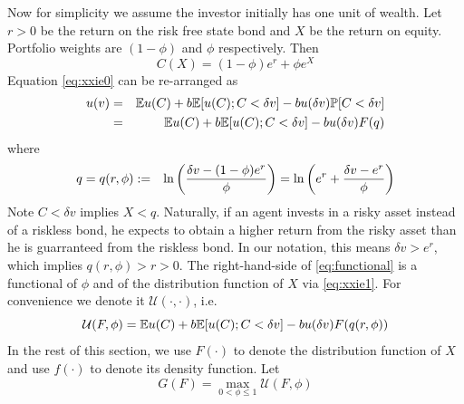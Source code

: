 \documentclass{article}
\begin{document}
Now for simplicity we assume the investor initially has one unit of
wealth. Let $r > 0$ be the return on the risk free state bond and $X$
be the return on equity. Portfolio weights are $\left(1-\phi\right)$
and $\phi$ respectively. Then
\begin{equation}
  \label{eq:xxie1}
  C(X) = (1 - \phi) e^r + \phi e^X
\end{equation}
Equation \eqref{eq:xxie0} can be re-arranged as
\begin{eqnarray}
u(v) &=& \mathbb{E} u(C) + b \mathbb{E} [u(C); C < \delta v] - b u(\delta v) \mathbb{P}[C < \delta v] \nonumber \\
&=& \mathbb{E} u(C) + b \mathbb{E} [u(C); C < \delta v] - b u(\delta v) F(q) \label{eq:functional}
\end{eqnarray}
where
\begin{eqnarray*}
  q = q(r, \phi) &:=& \ln \left( {
      \delta v - (1 - \phi) e^r
      \over
      \phi
    } \right) = \ln\left(
    e^r + {\delta v - e^r \over \phi}
  \right)
\end{eqnarray*}
Note $C < \delta v$ implies $X < q$. Naturally, if an agent invests in
a risky asset instead of a riskless bond, he expects to obtain a
higher return from the risky asset than he is guarranteed from the
riskless bond. In our notation, this means $\delta v > e^r$, which
implies $q(r, \phi) > r > 0$. The right-hand-side of
\eqref{eq:functional} is a functional of $\phi$ and of the distribution
function of $X$ via \eqref{eq:xxie1}. For convenience we denote it
$\mathcal U(\cdot, \cdot)$, i.e.
\begin{equation}
  \label{eq:U_functional}
  \mathcal U(F, \phi)
  = 
  \mathbb{E} u(C) + b \mathbb{E} [u(C); C < \delta v] - b u(\delta v) F(q(r, \phi))
\end{equation}
In the rest of this section, we use $F(\cdot)$ to denote the
distribution function of $X$ and use $f(\cdot)$ to denote its density
function. Let
\begin{equation}
  \label{eq:G_functional}
  G(F) = \max_{0 < \phi \leq 1} \mathcal U(F, \phi)  
\end{equation}
\end{document}

